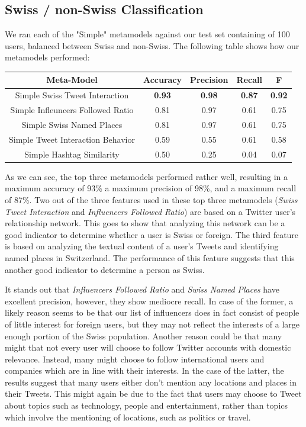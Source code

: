 \documentclass[10pt,a4paper]{article}
\begin{document}
\subsection{Swiss / non-Swiss Classification}
We ran each of the "Simple" metamodels against our test set containing of 100 users, balanced between Swiss and non-Swiss. The following table shows how our metamodels performed:

\begin{center}
\begin{tabular}{ |c|c|c|c|c| }
\hline
\textbf{Meta-Model} & \textbf{Accuracy} & \textbf{Precision} & \textbf{Recall} & \textbf{F} \\
\hline
Simple Swiss Tweet Interaction & \textbf{0.93} & \textbf{0.98} & \textbf{0.87} & \textbf{0.92} \\
\hline
Simple Infleuncers Followed Ratio & 0.81 & 0.97 & 0.61 & 0.75 \\
\hline
Simple Swiss Named Places & 0.81 & 0.97 & 0.61 & 0.75 \\
\hline
\hline
Simple Tweet Interaction Behavior & 0.59 & 0.55 & 0.61 & 0.58 \\
\hline
Simple Hashtag Similarity & 0.50 & 0.25 & 0.04 & 0.07 \\
\hline
\end{tabular}
\end{center}

As we can see, the top three metamodels performed rather well, resulting in a maximum accuracy of 93\% a maximum precision of 98\%, and a maximum recall of 87\%. Two out of the three features used in these top three metamodels (\textit{Swiss Tweet Interaction} and \textit{Influencers Followed Ratio}) are based on a Twitter user's relationship network. This goes to show that analyzing this network can be a good indicator to determine whether a user is Swiss or foreign. The third feature is based on analyzing the textual content of a user's Tweets and identifying named places in Switzerland. The performance of this feature suggests that this another good indicator to determine a person as Swiss.

It stands out that \textit{Influencers Followed Ratio} and \textit{Swiss Named Places} have excellent precision, however, they show mediocre recall. In case of the former, a likely reason seems to be that our list of influencers does in fact consist of people of little interest for foreign users, but they may not reflect the interests of a large enough portion of the Swiss population. Another reason could be that many might that not every user will choose to follow Twitter accounts with domestic relevance. Instead, many might choose to follow international users and companies which are in line with their interests. In the case of the latter, the results suggest that many  users either don't mention any locations and places in their Tweets. This might again be due to the fact that users may choose to Tweet about topics such as technology, people and entertainment, rather than topics which involve the mentioning of locations, such as politics or travel.
\end{document}
